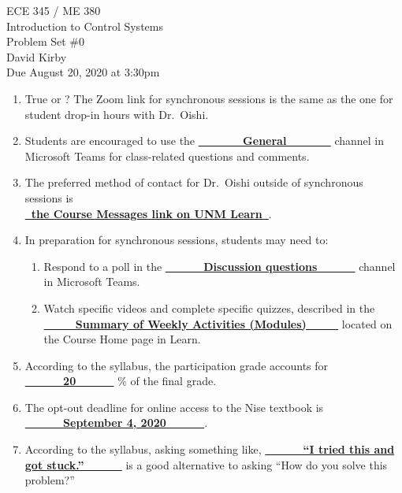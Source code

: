 \documentclass[11pt]{article}
\begin{document}
 	\begin{center}
 	\LARGE{ECE 345 / ME 380\\Introduction to Control Systems\\Problem Set \#0}\\[1.5em]
 	\large David Kirby\\[1.5em]
 	\large Due August 20, 2020 at 3:30pm\\[2.5em]
 	\end{center}

\begin{enumerate}
    \item True or ? The Zoom link for synchronous sessions is the same as the one for student drop-in hours with Dr.\ Oishi.
    \item Students are encouraged to use the \underline{\bfseries{\ \ \ \ \ \ \ General\ \ \ \ \ \ \ }} channel in Microsoft Teams for class-related questions and comments.
    \item The preferred method of contact for Dr.\ Oishi outside of synchronous sessions is\\[1em] \underline{\bfseries{\ the Course Messages link on UNM Learn\ }}.
    \item In preparation for synchronous sessions, students may need to:
    \begin{enumerate}
        \item Respond to a poll in the \underline{\bfseries{\ \ \ \ \ \ Discussion questions\ \ \ \ \ \ }} channel in Microsoft Teams.
        \item Watch specific videos and complete specific quizzes, described in the\\ \underline{\bfseries{\ \ \ \ \ Summary of Weekly Activities (Modules)\ \ \ \ \ }} located on the Course Home page in Learn.
    \end{enumerate}
    \item According to the syllabus, the participation grade accounts for \underline{\bfseries{\ \ \ \ \ \ 20\ \ \ \ \ \ }} \% of the final grade.
    \item The opt-out deadline for online access to the Nise textbook is \underline{\bfseries{\ \ \ \ \ \ September 4, 2020\ \ \ \ \ \ }}.
    \item According to the syllabus, asking something like, \underline{\bfseries{\ \ \ \ \ \ ``I tried this and got stuck.''\ \ \ \ \ \ }} is a good alternative to asking ``How do you solve this problem?''
\end{enumerate}
\end{document}
